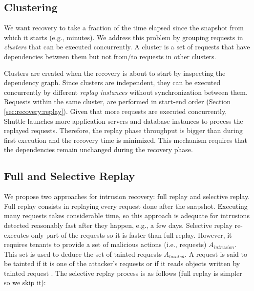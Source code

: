\subsection{Clustering}
\label{sec:recovery:clusters}

We want recovery to take a fraction of the time elapsed since the snapshot from which it starts (e.g., minutes). 
We address this problem by grouping  requests in \emph{clusters} that can be executed concurrently. 
A cluster is a set of requests that have dependencies between them but not from/to requests in other clusters. 

Clusters are created when the recovery is about to start by inspecting the dependency graph. Since clusters are independent, they can be executed concurrently by different \emph{replay instances} without  synchronization between them. Requests within the same cluster, are performed in start-end order (Section \ref{sec:recovery:replay}). Given that more requests are executed concurrently, Shuttle launches more application servers and database instances to process the replayed requests. Therefore, the replay phase throughput is bigger than during first execution and the recovery time is minimized. This mechanism requires that the dependencies remain unchanged during the recovery phase.


\subsection{Full and Selective Replay}
\label{sec:recovery:selective_replay}

We propose two approaches for intrusion recovery: full replay and selective replay. Full replay consists in replaying every request done after the  snapshot. Executing many requests takes considerable time, so this approach is adequate for intrusions detected reasonably fast after they happen, e.g., a few days. Selective replay re-executes only part of the requests so it is faster than full-replay. However, it requires tenants to provide a set of malicious actions (i.e., requests) $A_{intrusion}$. This set is used to deduce the set of tainted requests $A_{tainted}$. A request is said to be tainted if it is one of the attacker’s requests or if it reads objects written by tainted request \cite{taser,itdb,phoenix}.  The selective replay process is as follows (full replay is simpler so we skip it):

